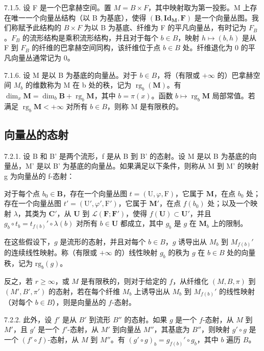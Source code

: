 7.1.5. 设 F 是一个巴拿赫空间。置 \(M = B \times F\)，其中映射取为第一投影。M 上存在唯一一个向量丛结构（以 B 为基底），使得 \((\mathbf{B}, \mathbf{Id}_{\mathbf{M}}, \mathbf{F})\) 是一个向量丛图。我们称赋予此结构的 \(B \times F\) 为以 B 为基底、纤维为 F 的平凡向量丛，有时记为 \(F_{B}\)。\(F_{B}\) 的流形结构是乘积流形结构，并且对于每个 \(b \in B\)，映射 \(h \mapsto (b, h)\) 是从 F 到 \(F_{B}\) 的纤维的巴拿赫空间同构，该纤维位于点 \(b \in B\) 处。纤维退化为 0 的平凡向量丛通常记为 0。

7.1.6. 设 M 是以 B 为基底的向量丛。对于 \(b \in B\)，将（有限或 \(+\infty\) 的）巴拿赫空间 \(M_{b}\) 的维数称为 M 在 b 处的秩，记为 \(\operatorname{rg}_{b}(\mathbf{M})\)。有 \(\dim_{x}\mathbf{M} = \dim_{b}\mathbf{B} + \operatorname{rg}_{b}\mathbf{M}\)，其中 \(b = \pi(x)\)。函数 \(b \mapsto \operatorname{rg}_{b}\mathbf{M}\) 局部常值。若满足 \(\operatorname{rg}_{b}\mathbf{M} < +\infty\) 对所有 \(b \in B\)，则称 M 是有限秩的。

\subsection{向量丛的态射}

7.2.1. 设 B 和 B' 是两个流形，f 是从 B 到 B' 的态射。设 M 是以 B 为基底的向量丛，M' 是以 B' 为基底的向量丛。如果满足以下条件，则称从 M 到 M' 的映射 g 为向量丛的 f-态射：

对于每个点 \(b_0 \in \mathbf{B}\)，存在一个向量丛图 \(t = (\mathrm{U}, \varphi, \mathrm{F})\)，它属于 \(\mathbf{M}\)，在点 \(b_0\) 处；存在一个向量丛图 \(t' = (\mathrm{U}', \varphi', \mathrm{F}')\)，它属于 \(\mathbf{M}'\)，在点 \(f(b_0)\) 处；以及一个映射 \(\lambda\)，其类为 \(\mathbf{C}'\)，从 \(\mathbf{U}\) 到 \(\mathcal{L}(\mathbf{F}; \mathbf{F}')\)，使得 \(f(\mathbf{U}) \subset \mathbf{U}'\)，并且 \(g_b \circ t_b = t_{f(b)}' \circ \lambda(b)\) 对所有 \(b \in \mathbf{U}\) 都成立，其中 \(g_b\) 是 \(g\) 在 \(\mathbf{M}_b\) 上的限制。

在这些假设下，\(g\) 是流形的态射，并且对每个 \(b \in B\)，\(g\) 诱导出从 \(M_b\) 到 \(M_{f(b)}'\) 的连续线性映射。称（有限或 \(+\infty\) 的）线性映射 \(g_b\) 的秩为 \(g\) 在 \(b \in B\) 处的向量秩，记为 \(\text{rg}_b(g)\)。

反之，若 \(r \geqslant \infty\)，或 \(M\) 是有限秩的，则对于给定的 \(f\)，从纤维化 \((M, B, \pi)\) 到 \((M', B', \pi')\) 的态射，若在每个纤维 \(M_b\) 上诱导出从 \(M_b\) 到 \(M_{f(b)}'\) 的线性映射（对每个 \(b \in B\)），则是向量丛的 \(f\)-态射。

7.2.2. 此外，设 \(f'\) 是从 \(B'\) 到流形 \(B''\) 的态射。如果 \(g\) 是一个 \(f\)-态射，从 \(M\) 到 \(M'\)，且 \(g'\) 是一个 \(f'\)-态射，从 \(M'\) 到向量丛 \(M''\)，其基底为 \(B''\)，则映射 \(g' \circ g\) 是一个 \((f' \circ f)\)-态射，从 \(M\) 到 \(M''\)。有 \((g' \circ g)_b = g_{f(b)}' \circ g_b\)，其中 \(b\) 遍历 \(B\)。

